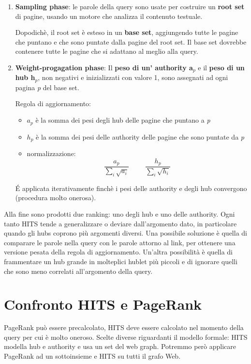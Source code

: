 \begin{enumerate}
    \item \textbf{Sampling phase}: le parole della query sono usate per costruire un \textbf{root set} di pagine, usando un motore che analizza il contenuto testuale. 
    
    Dopodichè, il root set è esteso in un \textbf{base set}, aggiungendo tutte le pagine che puntano e che sono puntate dalla pagine del root set. Il base set dovrebbe contenere tutte le pagine che si adattano al meglio alla query. 
    
    \item \textbf{Weight-progagation phase}: Il \textbf{peso di un' authority a}$_p$ e il \textbf{peso di un hub h$_p$}, non negativi e inizializzati con valore 1, sono assegnati ad ogni pagina \emph{p} del base set. 
    
    Regola di aggiornamento:
    \begin{itemize}
        \item $a_p$ è la somma dei pesi degli hub delle pagine che puntano a \emph{p}
        \item $h_p$ è la somma dei pesi delle authority delle pagine che sono puntate da \emph{p}
        \item normalizzazione:
        \[
           \dfrac{a_p}{\sum\limits_i \sqrt{a_i}} \hspace{1cm} \dfrac{h_p}{\sum\limits_i \sqrt{h_i}}
        \]
    \end{itemize}
    \'E applicata iterativamente finchè i pesi delle authority e degli hub convergono (procedura molto onerosa).
\end{enumerate}

 Alla fine sono prodotti due ranking: uno degli hub e uno delle authority. Ogni tanto HITS tende a generalizzare o deviare dall'argomento dato, in particolare quando gli hubs coprono più argomenti diversi.
 Una possibile soluzione è quella di comparare le parole nella query con le parole attorno al link, per ottenere una versione pesata della regola di aggiornamento. Un'altra possibilità è quella di frammentare un hub grande in molteplici hublet più piccoli e di ignorare quelli che sono meno correlati all'argomento della query. 
 
 \section{Confronto HITS e PageRank}
 PageRank può essere precalcolato, HITS deve essere calcolato nel momento della query per cui è molto oneroso. Scelte diverse riguardanti il modello formale: HITS modella hub e authority e usa un set del web graph. 
 Potremmo però applicare PageRank ad un sottoinsieme e HITS su tutti il grafo Web.
 
